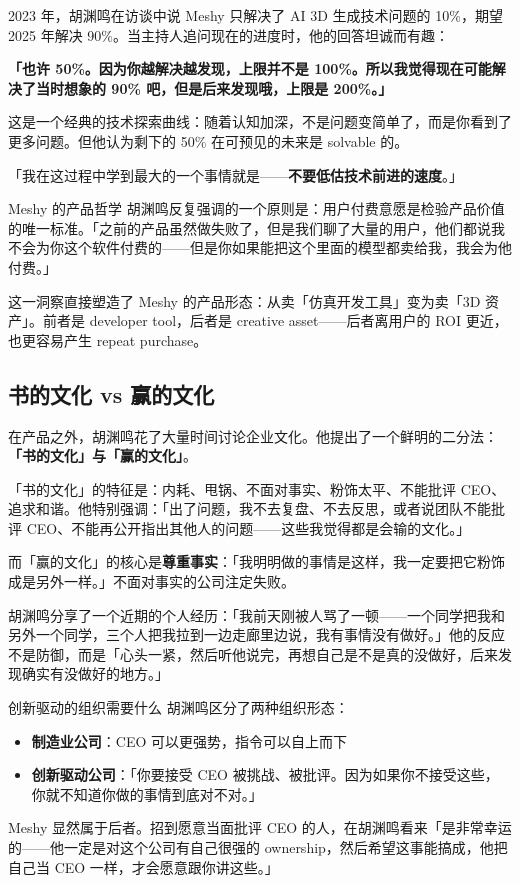 \documentclass[a4paper]{article}
\begin{document}
2023 年，胡渊鸣在访谈中说 Meshy 只解决了 AI 3D 生成技术问题的 10\%，期望 2025 年解决 90\%。当主持人追问现在的进度时，他的回答坦诚而有趣：

\textbf{「也许 50\%。因为你越解决越发现，上限并不是 100\%。所以我觉得现在可能解决了当时想象的 90\% 吧，但是后来发现哦，上限是 200\%。」}

这是一个经典的技术探索曲线：随着认知加深，不是问题变简单了，而是你看到了更多问题。但他认为剩下的 50\% 在可预见的未来是 solvable 的。

「我在这过程中学到最大的一个事情就是——\textbf{不要低估技术前进的速度}。」

\begin{knowledgebox}{Meshy 的产品哲学}
胡渊鸣反复强调的一个原则是：用户付费意愿是检验产品价值的唯一标准。「之前的产品虽然做失败了，但是我们聊了大量的用户，他们都说我不会为你这个软件付费的——但是你如果能把这个里面的模型都卖给我，我会为他付费。」

这一洞察直接塑造了 Meshy 的产品形态：从卖「仿真开发工具」变为卖「3D 资产」。前者是 developer tool，后者是 creative asset——后者离用户的 ROI 更近，也更容易产生 repeat purchase。
\end{knowledgebox}

\subsection{书的文化 vs 赢的文化}

在产品之外，胡渊鸣花了大量时间讨论企业文化。他提出了一个鲜明的二分法：\textbf{「书的文化」与「赢的文化」}。

「书的文化」的特征是：内耗、甩锅、不面对事实、粉饰太平、不能批评 CEO、追求和谐。他特别强调：「出了问题，我不去复盘、不去反思，或者说团队不能批评 CEO、不能再公开指出其他人的问题——这些我觉得都是会输的文化。」

而「赢的文化」的核心是\textbf{尊重事实}：「我明明做的事情是这样，我一定要把它粉饰成是另外一样。」不面对事实的公司注定失败。

胡渊鸣分享了一个近期的个人经历：「我前天刚被人骂了一顿——一个同学把我和另外一个同学，三个人把我拉到一边走廊里边说，我有事情没有做好。」他的反应不是防御，而是「心头一紧，然后听他说完，再想自己是不是真的没做好，后来发现确实有没做好的地方。」

\begin{importantbox}{创新驱动的组织需要什么}
胡渊鸣区分了两种组织形态：
\begin{itemize}
    \item \textbf{制造业公司}：CEO 可以更强势，指令可以自上而下
    \item \textbf{创新驱动公司}：「你要接受 CEO 被挑战、被批评。因为如果你不接受这些，你就不知道你做的事情到底对不对。」
\end{itemize}
Meshy 显然属于后者。招到愿意当面批评 CEO 的人，在胡渊鸣看来「是非常幸运的——他一定是对这个公司有自己很强的 ownership，然后希望这事能搞成，他把自己当 CEO 一样，才会愿意跟你讲这些。」
\end{importantbox}
\end{document}

